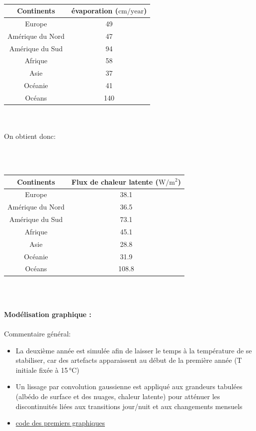 \documentclass[a4paper,12pt]{article}
\begin{document}
\\

\begin{tabular}{|c|c|}
\hline
Continents & évaporation ($\mathrm{cm/year}$) \\
\hline
Europe & 49 \\
\hline
Amérique du Nord & 47 \\
\hline
Amérique du Sud & 94 \\
\hline
Afrique & 58 \\
\hline
Asie & 37 \\
\hline
Océanie & 41 \\
\hline
Océans & 140 \\
\hline
\end{tabular}
\\

\\
On obtient donc:

\\
\vspace{0,5cm}
\\
\begin{tabular}{|c|c|}
\hline
Continents & Flux de chaleur latente ($\mathrm{W/m^2}$) \\
\hline
Europe & 38.1 \\
\hline
Amérique du Nord & 36.5 \\
\hline
Amérique du Sud & 73.1 \\
\hline
Afrique & 45.1 \\
\hline
Asie & 28.8 \\
\hline
Océanie & 31.9 \\
\hline
Océans & 108.8 \\
\hline
\end{tabular}
\\
\\

\textbf{Modélisation graphique : }
\\
\\
Commentaire général: 
\begin{itemize}
    \item La deuxième année est simulée afin de laisser le temps à la température de se stabiliser, car des artefacts apparaissent au début de la première année (T initiale fixée à 15 °C)
    \item Un lissage par convolution gaussienne est appliqué aux grandeurs tabulées (albédo de surface et des nuages, chaleur latente) pour atténuer les discontinuités liées aux transitions jour/nuit et aux changements mensuels
    \item \href{https://github.com/pierrelouis-cmrt/CREPES/blob/main/modele4/code/modele_courbe.py}{code des premiers graphiques}
\end{itemize}
\end{document}
